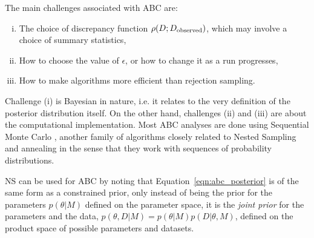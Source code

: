 \documentclass[article]{jss}
\newcommand{\params}{\theta}
\begin{document}
The main challenges associated with ABC are:
\begin{enumerate}[(i)]
\item The choice of discrepancy function $\rho(D; D_{\rm observed})$, which
may involve a choice of summary statistics,
\item How to choose the value of $\epsilon$, or how to change it as a run
progresses,
\item How to make algorithms more efficient than rejection sampling.
\end{enumerate}
Challenge (i) is Bayesian in nature, i.e. it relates to the very
definition of the posterior distribution itself.
On the other hand, challenges (ii) and (iii) are about the computational
implementation. Most ABC analyses are done using Sequential Monte Carlo
\citep[SMC; ][]{delmoral}, another family of algorithms closely related
to Nested Sampling and annealing in the sense that they work with
sequences of probability distributions.

NS can be used for ABC by noting that Equation~\ref{eqn:abc_posterior}
is of the same form as a constrained prior, only instead of being the prior
for the parameters $p(\theta | M)$ defined on the parameter space, it is
the {\em joint prior} for the parameters and the data,
$p(\theta, D |M) = p(\theta | M)p(D | \theta, M)$, defined on the product
space of possible parameters and datasets.


\end{document}
